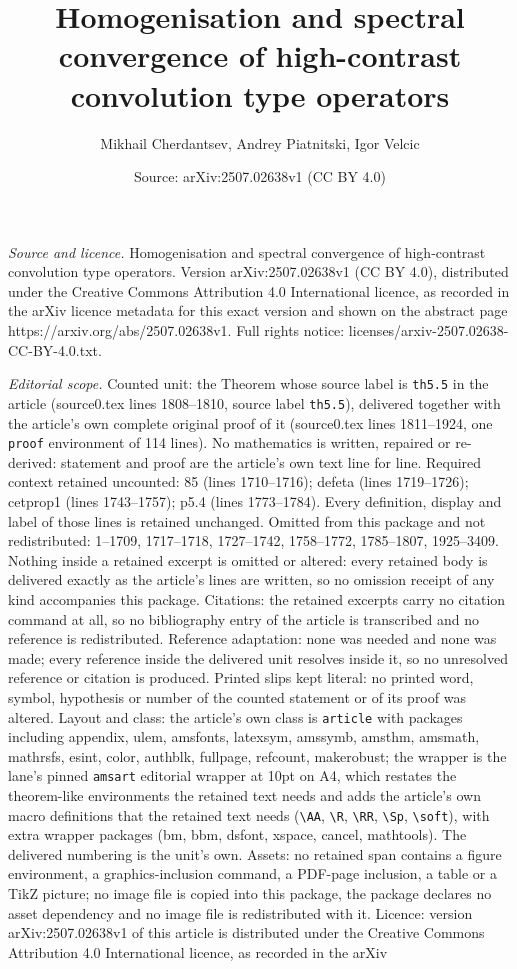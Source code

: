 \documentclass[10pt,a4paper]{amsart}
\title[Homogenisation and spectral convergence of high-contrast con]{Homogenisation and spectral convergence of high-contrast convolution type operators}
\author{Mikhail Cherdantsev, Andrey Piatnitski, Igor Velcic}
\date{Source: arXiv:2507.02638v1 (CC BY 4.0)}
\begin{document}
\maketitle

\noindent\emph{Source and licence.} Homogenisation and spectral convergence of high-contrast convolution type operators. Version arXiv:2507.02638v1 (CC BY 4.0), distributed under the Creative Commons Attribution 4.0 International licence, as recorded in the arXiv licence metadata for this exact version and shown on the abstract page https://arxiv.org/abs/2507.02638v1. Full rights notice: licenses/arxiv-2507.02638-CC-BY-4.0.txt.\par\smallskip

\noindent\textit{Editorial scope.} Counted unit: the Theorem whose source label is \texttt{th5.5} in the article (source0.tex lines 1808--1810, source label \texttt{th5.5}), delivered together with the article's own complete original proof of it (source0.tex lines 1811--1924, one \texttt{proof} environment of 114 lines). No mathematics is written, repaired or re-derived: statement and proof are the article's own text line for line. Required context retained uncounted: 85 (lines 1710--1716); defeta (lines 1719--1726); cetprop1 (lines 1743--1757); p5.4 (lines 1773--1784). Every definition, display and label of those lines is retained unchanged. Omitted from this package and not redistributed: 1--1709, 1717--1718, 1727--1742, 1758--1772, 1785--1807, 1925--3409. Nothing inside a retained excerpt is omitted or altered: every retained body is delivered exactly as the article's lines are written, so no omission receipt of any kind accompanies this package. Citations: the retained excerpts carry no citation command at all, so no bibliography entry of the article is transcribed and no reference is redistributed. Reference adaptation: none was needed and none was made; every reference inside the delivered unit resolves inside it, so no unresolved reference or citation is produced. Printed slips kept literal: no printed word, symbol, hypothesis or number of the counted statement or of its proof was altered. Layout and class: the article's own class is \texttt{article} with packages including appendix, ulem, amsfonts, latexsym, amssymb, amsthm, amsmath, mathrsfs, esint, color, authblk, fullpage, refcount, makerobust; the wrapper is the lane's pinned \texttt{amsart} editorial wrapper at 10pt on A4, which restates the theorem-like environments the retained text needs and adds the article's own macro definitions that the retained text needs (\texttt{\textbackslash AA}, \texttt{\textbackslash R}, \texttt{\textbackslash RR}, \texttt{\textbackslash Sp}, \texttt{\textbackslash soft}), with extra wrapper packages (bm, bbm, dsfont, xspace, cancel, mathtools). The delivered numbering is the unit's own. Assets: no retained span contains a figure environment, a graphics-inclusion command, a PDF-page inclusion, a table or a TikZ picture; no image file is copied into this package, the package declares no asset dependency and no image file is redistributed with it. Licence: version arXiv:2507.02638v1 of this article is distributed under the Creative Commons Attribution 4.0 International licence, as recorded in the arXiv 
\end{document}
